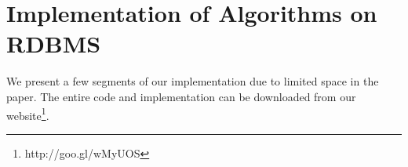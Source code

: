 \documentclass[11pt]{article}
\begin{document}
%



\section{\textbf{Implementation of Algorithms on RDBMS}}
We present a few segments of our implementation due to limited space in the paper. The entire code and implementation can be downloaded from our website\footnote{http://goo.gl/wMyUOS}.
\end{document}
